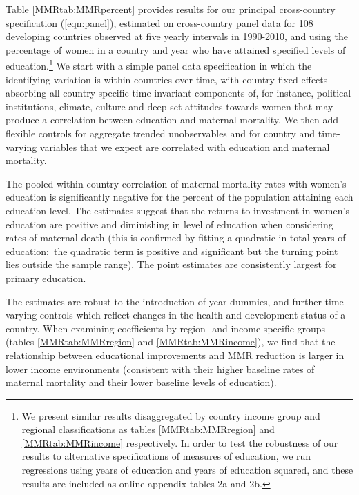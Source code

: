 \documentclass{article}[12pt,subeqn]
\begin{document}
\begin{spacing}{1.4}
Table \ref{MMRtab:MMRpercent} provides results for our principal cross-country 
specification (\ref{eqn:panel}), estimated on cross-country panel data for 108 
developing countries observed at five yearly intervals in 1990-2010, and using 
the percentage of women in a country and year who have attained specified levels
of education.\footnote{We present similar results disaggregated by country income
group and regional classifications as tables \ref{MMRtab:MMRregion} and
\ref{MMRtab:MMRincome} respectively. In order to test the robustness of our
results to alternative specifications of measures of education, we run regressions
using years of education and years of education squared, and these results are
included as online appendix tables 2a and 2b.} We start with a simple panel data
specification in which the identifying variation is within countries over time,
with country fixed effects absorbing all country-specific time-invariant
components of, for instance, political institutions, climate, culture and deep-set
attitudes towards women that may produce a correlation between education and
maternal mortality. We then add flexible controls for aggregate trended
unobservables and for country and time-varying variables that we expect are
correlated with education and maternal mortality.

The pooled within-country correlation of maternal mortality rates with women's 
education is significantly negative for the percent of the population attaining 
each education level. The estimates suggest that the returns to investment in
women's education are positive and diminishing in level of education when
considering rates of maternal death (this is confirmed by fitting a quadratic in
total years of education:\ the quadratic term is positive and significant but
the turning point lies outside the sample range). The point estimates are
consistently largest for primary education.%

The estimates are robust to the introduction of year dummies, and further 
time-varying controls which reflect changes in the health and development status 
of a country. When examining coefficients by region- and income-specific groups 
(tables \ref{MMRtab:MMRregion} and \ref{MMRtab:MMRincome}), we find that the 
relationship between educational improvements and MMR reduction is larger in lower 
income environments (consistent with their higher baseline rates of maternal 
mortality and their lower baseline levels of education).


\end{spacing}
\end{document}
